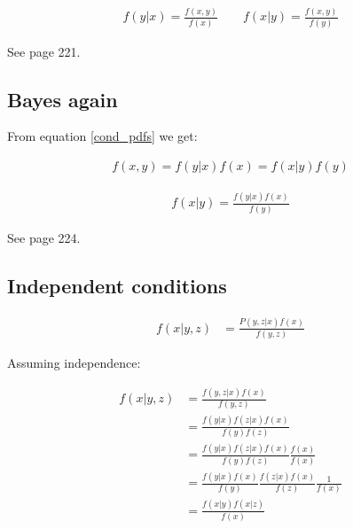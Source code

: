 \documentclass[preprint,authoryear,10pt]{elsarticle}
\begin{document}
\begin{align}\label{cond_pdfs}
f(y|x) = \frac{f(x, y)}{f(x)} \qquad f(x|y) = \frac{f(x, y)}{f(y)}
\end{align}

See \citet{Papoulis2002Probability} page 221.


%
%
\subsection{Bayes again}

From equation \ref{cond_pdfs} we get:

\begin{align}
f(x, y) = f(y|x)f(x) = f(x|y)f(y)
\end{align}

\begin{align}
f(x|y) = \frac{f(y|x)f(x)}{f(y)}
\end{align}

See \citet{Papoulis2002Probability} page 224.

\subsection{Independent conditions}

\begin{align}
f(x|y,z) &= \frac{P(y,z|x)f(x)}{f(y,z)}
\end{align}

Assuming independence:

\begin{align}
f(x|y,z) &= \frac{f(y,z|x)f(x)}{f(y,z)} \\
         &= \frac{f(y|x)f(z|x)f(x)}{f(y)f(z)} \\
         &= \frac{f(y|x)f(z|x)f(x)}{f(y)f(z)} \frac{f(x)}{f(x)}\\
         &= \frac{f(y|x)f(x)}{f(y)}\frac{f(z|x)f(x)}{f(z)}\frac{1}{f(x)} \\
         &= \frac{f(x|y)f(x|z)}{f(x)}
\end{align}



%
%
%
%


\end{document}
